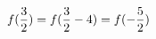 \documentclass[preview]{standalone}
\begin{document}
\begin{align*}
\special{dvisvgm:raw <g id='unique000'>}f(\frac{3}{2})=f(\frac{3}{2}-4)=f(-\frac{5}{2})\special{dvisvgm:raw </g>}
\end{align*}
\end{document}
